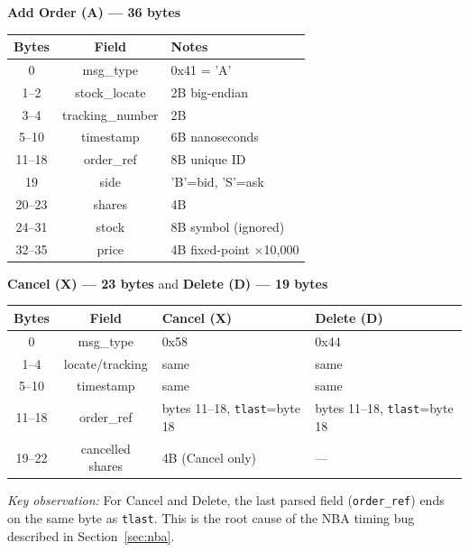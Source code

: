 \documentclass[11pt,a4paper]{article}
\begin{document}
\vspace{0.6em}
\noindent\textbf{Add Order (A) --- 36 bytes}

\begin{center}
\small
\begin{tabular}{c c l}
\toprule
\textbf{Bytes} & \textbf{Field} & \textbf{Notes} \\
\midrule
0      & msg\_type  & 0x41 = 'A' \\
1--2   & stock\_locate & 2B big-endian \\
3--4   & tracking\_number & 2B \\
5--10  & timestamp  & 6B nanoseconds \\
11--18 & order\_ref & 8B unique ID \\
19     & side       & 'B'=bid, 'S'=ask \\
20--23 & shares     & 4B \\
24--31 & stock      & 8B symbol (ignored) \\
32--35 & price      & 4B fixed-point $\times$10{,}000 \\
\bottomrule
\end{tabular}
\end{center}

\vspace{0.6em}
\noindent\textbf{Cancel (X) --- 23 bytes} \quad and \quad \textbf{Delete (D) --- 19 bytes}

\begin{center}
\small
\begin{tabular}{c c l l}
\toprule
\textbf{Bytes} & \textbf{Field} & \textbf{Cancel (X)} & \textbf{Delete (D)} \\
\midrule
0      & msg\_type  & 0x58 & 0x44 \\
1--4   & locate/tracking & same & same \\
5--10  & timestamp  & same & same \\
11--18 & order\_ref & bytes 11--18, \texttt{tlast}=byte 18 & bytes 11--18, \texttt{tlast}=byte 18 \\
19--22 & cancelled shares & 4B (Cancel only) & --- \\
\bottomrule
\end{tabular}
\end{center}

\noindent\textit{Key observation:} For Cancel and Delete, the last parsed field
(\texttt{order\_ref}) ends on the same byte as \texttt{tlast}. This is the root
cause of the NBA timing bug described in Section~\ref{sec:nba}.
\end{document}
